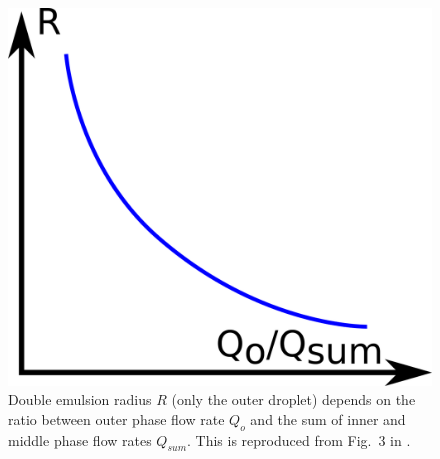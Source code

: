 \documentclass[onecolumn,aps, pre,amsmath,amssymb,longbibliography,12pt]{revtex4-2}
\begin{document}
\begin{figure}
  \includegraphics{size-outerflow.png}
  \caption{Double emulsion radius $R$ (only the outer droplet) depends on the ratio between outer phase flow rate $Q_o$ and the sum of inner and middle phase flow rates $Q_{sum}$.
  This is reproduced from Fig.~3 in \cite{Utada2005}.}
  \label{fig:size-outerflow}
\end{figure}



\end{document}
